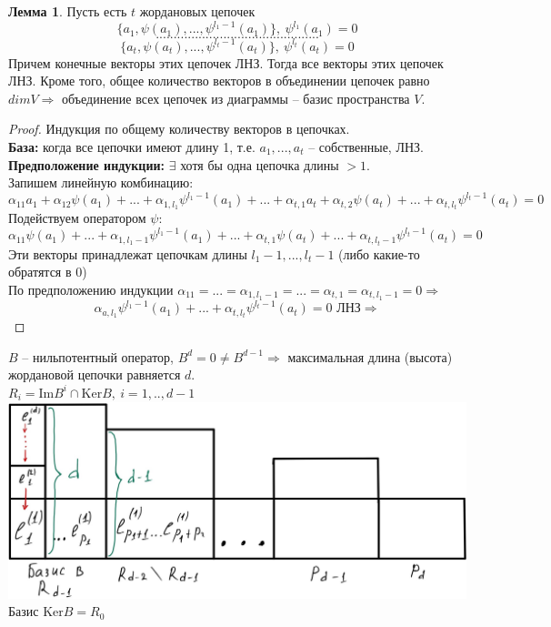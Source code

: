 \documentclass[a4paper, 12pt]{article}
\theoremstyle{definition}
\newtheorem*{lemma}{Лемма}
\begin{document}
    \newpage
    \begin{lemma}
        Пусть есть $t$ жордановых цепочек $$\{a_1,\psi(a_1),...,
        \psi^{l_1 - 1}(a_1)\},\ \psi^{l_1}(a_1) = 0$$
        $$..............................................$$
        $$\{a_t,\psi(a_t),...,
        \psi^{l_t - 1}(a_t)\},\ \psi^{l_t}(a_t) = 0$$
        Причем конечные векторы этих цепочек ЛНЗ. Тогда 
        все векторы этих цепочек ЛНЗ. Кроме того, общее
        количество векторов в объединении цепочек равно 
        $dim V \Longrightarrow$ объединение всех цепочек из
        диаграммы -- базис пространства $V$.  
    \end{lemma}
    \begin{proof}
        Индукция по общему количеству векторов в цепочках.\\
        \textbf{База:} когда все цепочки имеют длину 1, т.е.
        $a_1,...,a_t$ -- собственные, ЛНЗ.
        \textbf{Предположение индукции:} $\exists$ хотя бы 
        одна цепочка длины $> 1$. \\
        Запишем линейную комбинацию: 
        $$\alpha_{11}a_1 + \alpha_{12}\psi(a_1) + ... +
        \alpha_{1,l_1}\psi^{l_1 - 1}(a_1) +...+ 
        \alpha_{t,1}a_t + \alpha_{t,2}\psi(a_t) +...+
        \alpha_{t,l_t}\psi^{l_t-1}(a_t) = 0$$
        Подействуем оператором $\psi$:
        $$\alpha_{11}\psi(a_1) + ... +
        \alpha_{1,l_1 - 1}\psi^{l_1 - 1}(a_1) +...+ 
        \alpha_{t,1}\psi(a_t) +...+
        \alpha_{t,l_t - 1}\psi^{l_t-1}(a_t) = 0$$ 
        Эти векторы принадлежат цепочкам длины $l_1 - 1,...,
        l_t - 1$ (либо какие-то\\ обратятся в 0)\\
        По предположению индукции
        $\alpha_{11} = ... = \alpha_{1,l_1 - 1} = ... = 
        \alpha_{t,1} = \alpha_{t,l_1 - 1} = 0 \Longrightarrow$
        $$\alpha_{a,l_1}\psi^{l_1 - 1}(a_1) +...+
        \alpha_{t,l_t}\psi^{l_t - 1}(a_t) = 0 \text{ ЛНЗ}
        \Longrightarrow$$ 
    \end{proof}
    $B$ -- нильпотентный оператор, $B^d = 0 \neq B^{d-1}
    \Longrightarrow $ максимальная длина (высота) жордановой
    цепочки равняется $d$.\\
    $R_i = \text{Im}B^i \cap \text{Ker}B,\ i = 1,..,d - 1$\\
    \includegraphics[scale = 0.25]{images/table2.JPG}\\
    Базис $\text{Ker}B = R_0$
    
\end{document}
